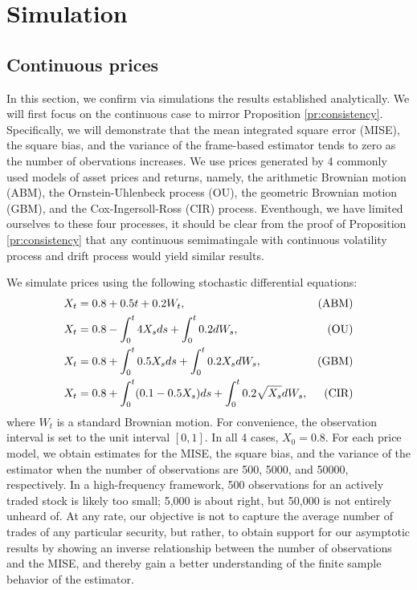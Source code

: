 \section{Simulation}\label{sec:simulation}
\subsection{Continuous prices}
In this section, we  confirm via simulations the results established analytically. We will first focus on the continuous case to mirror   Proposition \eqref{pr:consistency}.  Specifically, we will demonstrate that the mean integrated square error (MISE), the square bias, and the variance of the frame-based estimator tends to zero as the number of obervations increases.  We use prices generated by 4 commonly used models of asset prices and returns, namely, the  arithmetic Brownian motion (ABM),  the Ornstein-Uhlenbeck process (OU), the geometric Brownian motion (GBM), and the Cox-Ingersoll-Ross (CIR) process. Eventhough, we have limited ourselves to these four processes, it should be clear from the proof of Proposition \eqref{pr:consistency} that  any continuous \ito semimatingale with continuous volatility process and \cadlag drift process would yield similar results. 

We simulate prices using the following stochastic differential equations:
\begin{align}
  & X_t = 0.8 +  0.5  t + 0.2  W_t,\notag & \text{(ABM)}\\
  & X_t = 0.8 -\int_0^t 4 X_s d s + \int^t_0 0.2 d W_s,\notag & \text{(OU)}\\
  & X_t = 0.8 + \int_0^t 0.5 X_s d s + \int^t_0 0.2 X_s d W_s,\notag & \text{(GBM)}\\
  & X_t = 0.8 + \int_0^t(0.1 - 0.5 X_s)d s +\int^t_0  0.2 \sqrt{X_s} d W_s,\notag & \text{(CIR)}
  \label{}
\end{align}
where $W_t$ is a standard Brownian motion. For convenience, the observation interval is set to the unit interval $[0,1]$. In all 4 cases, $X_0 = 0.8$. For each price model, we obtain estimates for the MISE, the square bias, and the variance of the estimator  when the number of  observations are 500, 5000, and 50000, respectively. In a high-frequency framework, 500 observations for an actively traded stock is likely too small; 5,000 is about right, but 50,000 is not entirely unheard of. At any rate, our objective is not to capture the average number of trades of any particular security, but rather,  to obtain support for our asymptotic results by showing an inverse relationship between the number of observations and the MISE, and thereby gain a better understanding of the finite sample behavior of the estimator.

